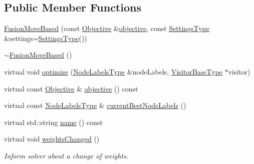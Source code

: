\subsection*{Public Member Functions}
\begin{DoxyCompactItemize}
\item 
\hyperlink{classnifty_1_1graph_1_1optimization_1_1multicut_1_1FusionMoveBased_a43022ed233ea798a5212635aa2e97600}{Fusion\+Move\+Based} (const \hyperlink{classnifty_1_1graph_1_1optimization_1_1multicut_1_1FusionMoveBased_a2777aaf3d5422e4a4ce78c8cd63683a6}{Objective} \&\hyperlink{classnifty_1_1graph_1_1optimization_1_1multicut_1_1FusionMoveBased_acf05c9f69f92ec7a5f007e31b46a0cc0}{objective}, const \hyperlink{structnifty_1_1graph_1_1optimization_1_1multicut_1_1FusionMoveBased_1_1SettingsType}{Settings\+Type} \&settings=\hyperlink{structnifty_1_1graph_1_1optimization_1_1multicut_1_1FusionMoveBased_1_1SettingsType}{Settings\+Type}())
\item 
\hyperlink{classnifty_1_1graph_1_1optimization_1_1multicut_1_1FusionMoveBased_ac57873d5837725d5e17c2365708ef80e}{$\sim$\+Fusion\+Move\+Based} ()
\item 
virtual void \hyperlink{classnifty_1_1graph_1_1optimization_1_1multicut_1_1FusionMoveBased_a6c649b08cc1bd4c7f2ce1f8063b59fad}{optimize} (\hyperlink{classnifty_1_1graph_1_1optimization_1_1multicut_1_1FusionMoveBased_a115c36aa582fbffc94eea3079d566122}{Node\+Labels\+Type} \&node\+Labels, \hyperlink{classnifty_1_1graph_1_1optimization_1_1common_1_1SolverBase_a5a14d64c70a9cc0eebc7d71d2b089f9b}{Visitor\+Base\+Type} $\ast$visitor)
\item 
virtual const \hyperlink{classnifty_1_1graph_1_1optimization_1_1multicut_1_1FusionMoveBased_a2777aaf3d5422e4a4ce78c8cd63683a6}{Objective} \& \hyperlink{classnifty_1_1graph_1_1optimization_1_1multicut_1_1FusionMoveBased_acf05c9f69f92ec7a5f007e31b46a0cc0}{objective} () const 
\item 
virtual const \hyperlink{classnifty_1_1graph_1_1optimization_1_1multicut_1_1FusionMoveBased_a115c36aa582fbffc94eea3079d566122}{Node\+Labels\+Type} \& \hyperlink{classnifty_1_1graph_1_1optimization_1_1multicut_1_1FusionMoveBased_afb3489218985fd9e3f8bbbab32b58357}{current\+Best\+Node\+Labels} ()
\item 
virtual std\+::string \hyperlink{classnifty_1_1graph_1_1optimization_1_1multicut_1_1FusionMoveBased_a201502ed5e5497ad8c2f8c15a1d7510a}{name} () const 
\item 
virtual void \hyperlink{classnifty_1_1graph_1_1optimization_1_1multicut_1_1FusionMoveBased_ab6e39a48aeea4d53b5bcf040aa43ac08}{weights\+Changed} ()
\begin{DoxyCompactList}\small\item\em Inform solver about a change of weights. \end{DoxyCompactList}\end{DoxyCompactItemize}



